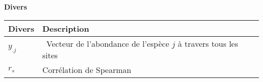 \textbf{Divers}

\begin{longtable}[l]{@{}ll@{}}
\toprule
\begin{minipage}[b]{0.19\columnwidth}\raggedright
Divers\strut
\end{minipage} & \begin{minipage}[b]{0.75\columnwidth}\raggedright
Description\strut
\end{minipage}\tabularnewline
\midrule
\endhead
\begin{minipage}[t]{0.19\columnwidth}\raggedright
\(y_{.j}\)\strut
\end{minipage} & \begin{minipage}[t]{0.75\columnwidth}\raggedright
~Vecteur de l'abondance de l'espèce \(j\) à travers tous les sites\strut
\end{minipage}\tabularnewline
\begin{minipage}[t]{0.19\columnwidth}\raggedright
\(r_s\)\strut
\end{minipage} & \begin{minipage}[t]{0.75\columnwidth}\raggedright
Corrélation de Spearman\strut
\end{minipage}\tabularnewline
\bottomrule
\end{longtable}
